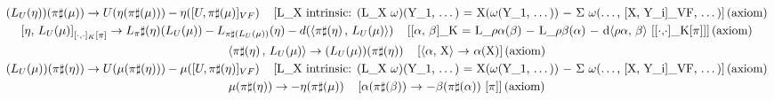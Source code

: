 \documentclass[11pt]{article}
\begin{document}
{\begin{gather*}
\left(L_U\!\left(\eta\right)\right)\!\left(\pi\sharp\!\left(\mu\right)\right) \to U\!\left(\eta\!\left(\pi\sharp\!\left(\mu\right)\right)\right) - \eta\!\left([U,\pi\sharp(\mu)]_{VF}\right) \quad \text{[L\_X intrinsic: (L\_X \ensuremath{\omega})(Y\_1, \ensuremath{\dots}) = X(\ensuremath{\omega}(Y\_1, \ensuremath{\dots})) \ensuremath{-} \ensuremath{\Sigma} \ensuremath{\omega}(\ensuremath{\dots}, [X, Y\_i]\_VF, \ensuremath{\dots})]\,(axiom)} \\
\left[\eta,\, L_U\!\left(\mu\right)\right]_{[\cdot,\cdot]_K[\pi]} \to L_\pi\sharp(\eta)\!\left(L_U\!\left(\mu\right)\right) - L_{\pi\sharp(L_U(\mu))}\!\left(\eta\right) - d\!\left(\langle \pi\sharp\!\left(\eta\right),\, L_U\!\left(\mu\right) \rangle\right) \quad \text{[[\ensuremath{\alpha}, \ensuremath{\beta}]\_K = L\_\ensuremath{\rho}\ensuremath{\alpha}(\ensuremath{\beta}) \ensuremath{-} L\_\ensuremath{\rho}\ensuremath{\beta}(\ensuremath{\alpha}) \ensuremath{-} d\ensuremath{\langle}\ensuremath{\rho}\ensuremath{\alpha}, \ensuremath{\beta}\ensuremath{\rangle} [[\ensuremath{\cdot},\ensuremath{\cdot}]\_K[\ensuremath{\pi}]]]\,(axiom)} \\
\langle \pi\sharp\!\left(\eta\right),\, L_U\!\left(\mu\right) \rangle \to \left(L_U\!\left(\mu\right)\right)\!\left(\pi\sharp\!\left(\eta\right)\right) \quad \text{[\ensuremath{\langle}\ensuremath{\alpha}, X\ensuremath{\rangle} \ensuremath{\to} \ensuremath{\alpha}(X)]\,(axiom)} \\
\left(L_U\!\left(\mu\right)\right)\!\left(\pi\sharp\!\left(\eta\right)\right) \to U\!\left(\mu\!\left(\pi\sharp\!\left(\eta\right)\right)\right) - \mu\!\left([U,\pi\sharp(\eta)]_{VF}\right) \quad \text{[L\_X intrinsic: (L\_X \ensuremath{\omega})(Y\_1, \ensuremath{\dots}) = X(\ensuremath{\omega}(Y\_1, \ensuremath{\dots})) \ensuremath{-} \ensuremath{\Sigma} \ensuremath{\omega}(\ensuremath{\dots}, [X, Y\_i]\_VF, \ensuremath{\dots})]\,(axiom)} \\
\mu\!\left(\pi\sharp\!\left(\eta\right)\right) \to -\eta\!\left(\pi\sharp\!\left(\mu\right)\right) \quad \text{[\ensuremath{\alpha}(\ensuremath{\pi}\ensuremath{\sharp}(\ensuremath{\beta})) \ensuremath{\to} \ensuremath{-}\ensuremath{\beta}(\ensuremath{\pi}\ensuremath{\sharp}(\ensuremath{\alpha})) [\ensuremath{\pi}]]\,(axiom)} \\

\end{gather*}}
\end{document}

